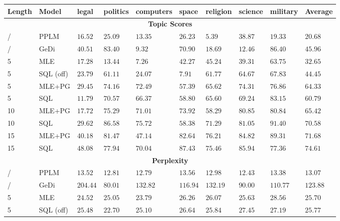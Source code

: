 




\begin{table*}
\centering
\small
\begin{tabular}{p{}l|p{}p{}p{}p{}p{}p{}p{}|>{\boldmath}l}
\toprule
\textbf{Length} & \textbf{Model} & \textbf{legal} & \textbf{politics} & \textbf{computers} & \textbf{space} & \textbf{religion} & \textbf{science} & \textbf{military} & \textbf{Average} \\
\midrule
\multicolumn{10}{c}{\textbf{Topic Scores}} \\
\midrule
/ & PPLM & $16.52$ & $25.09$ & $13.35$ & $26.23$ & $5.39$ & $38.87$ & $19.33$ & $20.68$ \\
/ & GeDi & $40.51$ & $83.40$ & $9.32$ & $70.90$ & $18.69$ & $12.46$ & $86.40$ & $45.96$ \\
5 & MLE       & $17.28$ & $13.44$ & $7.26$ & $42.27$ & $45.24$ & $39.31$ & $63.75$ & $32.65$ \\
5 & SQL (off) & $23.79$ & $61.11$ & $24.07$ & $7.91$ & $61.77$ & $64.67$ & $67.83$ & $44.45$ \\
5 & MLE+PG    & $29.45$ & $74.16$ & $72.49$ & $57.39$ & $65.62$ & $74.31$ & $76.86$ & $64.33$ \\
5 &  SQL      & $11.79$ & $70.57$ & $66.37$ & $58.80$ & $65.60$ & $69.24$ & $83.15$ & $60.79$ \\
10 & MLE+PG   & $17.72$ & $75.29$ & $71.01$ & $73.92$ & $58.29$ & $80.85$ & $80.84$ & $65.42$ \\
10 & SQL      & $29.62$ & $86.58$ & $75.72$ & $58.38$ & $71.29$ & $81.05$ & $91.40$ & $70.58$ \\
15 & MLE+PG   & $40.18$ & $81.47$ & $47.14$ & $82.64$ & $76.21$ & $84.82$ & $89.31$ & $71.68$ \\
15 & SQL      & $48.08$ & $77.94$ & $70.04$ & $87.43$ & $75.46$ & $85.94$ & $77.36$ & $74.61$ \\
\midrule
\multicolumn{10}{c}{\textbf{Perplexity}} \\
\midrule
/ & PPLM & $13.52$ & $12.81$ & $12.79$ & $13.56$ & $12.98$ & $12.43$ & $13.38$ & $13.07$ \\
/ & GeDi & $204.44$ & $80.01$ & $132.82$ & $116.94$ & $132.19$ & $90.00$ & $110.77$ & $123.88$ \\
5 & MLE       & $24.52$ & $25.05$ & $23.79$ & $26.26$ & $26.07$ & $25.63$ & $28.56$ & $25.70$ \\
5 & SQL (off) & $25.48$ & $22.70$ & $25.10$ & $26.64$ & $25.84$ & $27.45$ & $27.19$ & $25.77$ \\

\end{tabular}
\end{table*}
